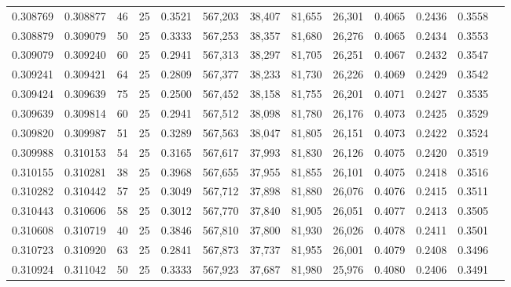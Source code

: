 \begin{tabular}{rrrrrrrrrrrrr}
0.308769 & 0.308877 &    46 &  25 &                                     0.3521 & 567,203 &  38,407 &  81,655 &  26,301 & 0.4065 & 0.2436 & 0.3558 \\
0.308879 & 0.309079 &    50 &  25 &                                     0.3333 & 567,253 &  38,357 &  81,680 &  26,276 & 0.4065 & 0.2434 & 0.3553 \\
0.309079 & 0.309240 &    60 &  25 &                                     0.2941 & 567,313 &  38,297 &  81,705 &  26,251 & 0.4067 & 0.2432 & 0.3547 \\
0.309241 & 0.309421 &    64 &  25 &                                     0.2809 & 567,377 &  38,233 &  81,730 &  26,226 & 0.4069 & 0.2429 & 0.3542 \\
0.309424 & 0.309639 &    75 &  25 &                                     0.2500 & 567,452 &  38,158 &  81,755 &  26,201 & 0.4071 & 0.2427 & 0.3535 \\
0.309639 & 0.309814 &    60 &  25 &                                     0.2941 & 567,512 &  38,098 &  81,780 &  26,176 & 0.4073 & 0.2425 & 0.3529 \\
0.309820 & 0.309987 &    51 &  25 &                                     0.3289 & 567,563 &  38,047 &  81,805 &  26,151 & 0.4073 & 0.2422 & 0.3524 \\
0.309988 & 0.310153 &    54 &  25 &                                     0.3165 & 567,617 &  37,993 &  81,830 &  26,126 & 0.4075 & 0.2420 & 0.3519 \\
0.310155 & 0.310281 &    38 &  25 &                                     0.3968 & 567,655 &  37,955 &  81,855 &  26,101 & 0.4075 & 0.2418 & 0.3516 \\
0.310282 & 0.310442 &    57 &  25 &                                     0.3049 & 567,712 &  37,898 &  81,880 &  26,076 & 0.4076 & 0.2415 & 0.3511 \\
0.310443 & 0.310606 &    58 &  25 &                                     0.3012 & 567,770 &  37,840 &  81,905 &  26,051 & 0.4077 & 0.2413 & 0.3505 \\
0.310608 & 0.310719 &    40 &  25 &                                     0.3846 & 567,810 &  37,800 &  81,930 &  26,026 & 0.4078 & 0.2411 & 0.3501 \\
0.310723 & 0.310920 &    63 &  25 &                                     0.2841 & 567,873 &  37,737 &  81,955 &  26,001 & 0.4079 & 0.2408 & 0.3496 \\
0.310924 & 0.311042 &    50 &  25 &                                     0.3333 & 567,923 &  37,687 &  81,980 &  25,976 & 0.4080 & 0.2406 & 0.3491 \\

\end{tabular}
